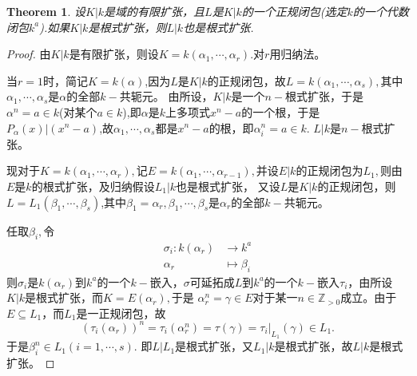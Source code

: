 \documentclass[UTF8]{article}
\newtheorem{thm}{Theorem}[section]
\begin{document}
\begin{thm}
设$K|k$是域的有限扩张，且$L$是$K|k$的一个正规闭包(选定$k$的一个代数闭包$k^{a}$).如果$K|k$是根式扩张，则$L|k$也是根式扩张.
\end{thm}
\begin{proof}
	由$K|k$是有限扩张，则设$K=k(\alpha_{1},\cdots,\alpha_{r}).$对$r$用归纳法。
	
	
	当$r=1$时，简记$K=k(\alpha)$,因为$L$是$K|k$的正规闭包，故$L=k(\alpha_{1},\cdots,\alpha_{s}),$其中$\alpha_{1},\cdots,\alpha_{s}$是$\alpha$的全部$k-$共轭元。
	由所设，$K|k$是一个$n-$根式扩张，于是$\alpha^{n}=a\in k$(对某个$a\in k$),即$\alpha$是$k$上多项式$x^{n}-a$的一个根，于是$P_{\alpha}(x)|(x^{n}-a)$,故$\alpha_{1},\cdots,\alpha_{s}$都是$x^{n}-a$的根，即$\alpha_{i}^{n}=a\in k.$ $L|k$是$n-$根式扩张。
	
	
	现对于$K=k(\alpha_{1},\cdots,\alpha_{r}),$记$E=k(\alpha_{1},\cdots,\alpha_{r-1}),$并设$E|k$的正规闭包为$L_{1},$则由$E$是$k$的根式扩张，及归纳假设$L_{1}|k$也是根式扩张，
	又设$L$是$K|k$的正规闭包，则$L=L_{1}(\beta_{1},\cdots,\beta_{s})$,其中$\beta_{1}=\alpha_{r},\beta_{1},\cdots,\beta_{s}$是$\alpha_{r}$的全部$k-$共轭元。
	
	
	任取$\beta_{i},$令
	\[
	\begin{split}
	\sigma_{i}:k(\alpha_{r})&\rightarrow k^{a}\\
	\alpha_{r}&\mapsto\beta_{i}
	\end{split}
	\]
	则$\sigma_{i}$是$k(\alpha_{r})$到$k^{a}$的一个$k-$嵌入，$\sigma$可延拓成$L$到$k^{a}$的一个$k-$嵌入$\tau_{i}$，由所设$K|k$是根式扩张，而$K=E(\alpha_{r}),$于是
	$\alpha_{r}^{n}=\gamma\in E$对于某一$n\in \mathbb{Z}_{>0}$成立。由于$E\subseteq L_{1}$，而$L_{1}$是一正规闭包，故
	$$
	(\tau_{i}(\alpha_{r}))^{n}=\tau_{i}(\alpha_{r}^{n})=\tau(\gamma)=\tau_{i}|_{L_{1}}(\gamma)\in L_{1}.
	$$
	于是$\beta_{i}^{n}\in L_{1}(i=1,\cdots,s).$
	即$L|L_{1}$是根式扩张，又$L_{1}|k$是根式扩张，故$L|k$是根式扩张。
\end{proof}
\end{document}
